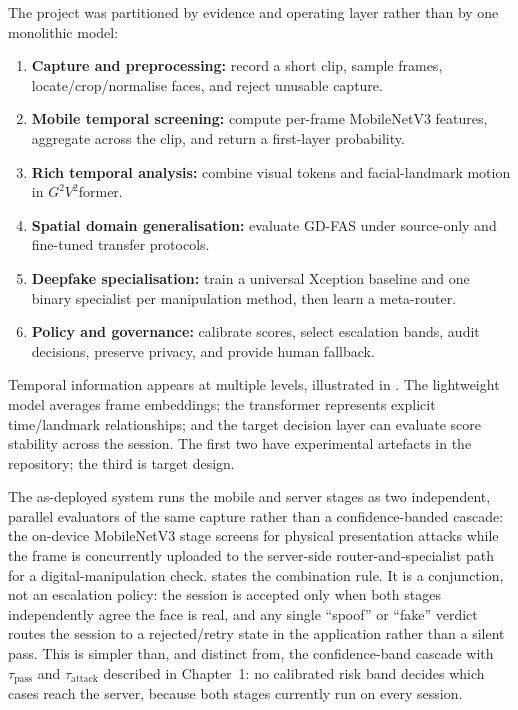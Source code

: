 The project was partitioned by evidence and operating layer rather than by one
monolithic model:

\begin{enumerate}
  \item \textbf{Capture and preprocessing:} record a short clip, sample frames,
        locate/crop/normalise faces, and reject unusable capture.
  \item \textbf{Mobile temporal screening:} compute per-frame MobileNetV3 features,
        aggregate across the clip, and return a first-layer probability.
  \item \textbf{Rich temporal analysis:} combine visual tokens and facial-landmark
        motion in $G^2V^2$former.
  \item \textbf{Spatial domain generalisation:} evaluate GD-FAS under source-only
        and fine-tuned transfer protocols.
  \item \textbf{Deepfake specialisation:} train a universal Xception baseline and
        one binary specialist per manipulation method, then learn a meta-router.
  \item \textbf{Policy and governance:} calibrate scores, select escalation bands,
        audit decisions, preserve privacy, and provide human fallback.
\end{enumerate}

Temporal information appears at multiple levels, illustrated in
. The lightweight model averages frame embeddings; the
transformer represents explicit time/landmark relationships; and the target
decision layer can evaluate score stability across the session. The first two
have experimental artefacts in the repository; the third is target design.

The as-deployed system runs the mobile and server stages as two independent,
parallel evaluators of the same capture rather than a confidence-banded cascade:
the on-device MobileNetV3 stage screens for physical presentation attacks while
the frame is concurrently uploaded to the server-side router-and-specialist path
for a digital-manipulation check.  states the
combination rule. It is a conjunction, not an escalation policy: the session is
accepted only when both stages independently agree the face is real, and any
single ``spoof'' or ``fake'' verdict routes the session to a rejected/retry state
in the application rather than a silent pass. This is simpler than, and
distinct from, the confidence-band cascade with $\tau_{\mathrm{pass}}$ and
$\tau_{\mathrm{attack}}$ described in Chapter~1: no calibrated risk band decides
which cases reach the server, because both stages currently run on every
session.

